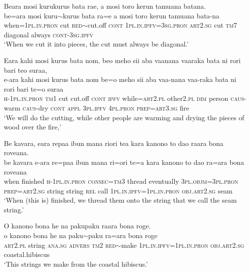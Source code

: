 \ea\label{ex:text20-34}
Beara mosi kurukurus bata rae, a mosi toro kerun tamuana batana.\\
\gll be=ara	mosi	kuru{$\sim$}kurus	bata	ra=e	a	mosi	toro	kerun	tamuana	bata-na\\
     when=1\textsc{pl}.\textsc{in}.\textsc{pron}	cut	\textsc{red}{$\sim$}cut.off	\textsc{cont}	1\textsc{pl}.\textsc{in}.\textsc{ipfv}=3\textsc{sg}.\textsc{pron}	\textsc{art}2.\textsc{sg}	cut	\textsc{tm}7	diagonal	always	\textsc{cont}-3\textsc{sg}.\textsc{ipfv}\\
\glt `When we cut it into pieces, the cut must always be diagonal.'
\z

\ea\label{ex:text20-35}
Eara kahi mosi kurus bata nom, beo meho sii aba vaanana vaaraka bata ni rori bari teo suraa,\\
\gll e-ara	kahi	mosi	kurus	bata	nom	be=o	meho	sii	aba	vaa-nana	vaa-raka	bata	ni	rori	bari	te=o	suraa\\
     \textsc{h}-1\textsc{pl}.\textsc{in}.\textsc{pron}	\textsc{tm}1	cut	cut.off	\textsc{cont}	\textsc{ipfv}	while=\textsc{art}2.\textsc{pl}	other2.\textsc{pl}	\textsc{dim}	person	\textsc{caus}-warm	\textsc{caus}-dry	\textsc{cont}	\textsc{appl}	3\textsc{pl}.\textsc{ipfv}	4\textsc{pl}.\textsc{pron}	\textsc{prep}=\textsc{art}3.\textsc{sg}	fire\\
\glt `We will do the cutting, while other people are warming and drying the pieces of wood over the fire,'
\z

\ea\label{ex:text20-36}
Be kavara, eara repaa ibun mana riori tea kara kanono to dao raara bona roveana.\\
\gll be	kavara	e-ara	re=paa	ibun	mana	ri=ori	te=a	kara	kanono	to	dao	ra=ara	bona	roveana\\
     when	finished	\textsc{h}-1\textsc{pl}.\textsc{in}.\textsc{pron}	\textsc{consec}=\textsc{tm}3	thread	eventually	3\textsc{pl}.\textsc{objm}=3\textsc{pl}.\textsc{pron}	\textsc{prep}=\textsc{art}2.\textsc{sg}	string	string	\textsc{rel}	call	1\textsc{pl}.\textsc{in}.\textsc{ipfv}=1\textsc{pl}.\textsc{in}.\textsc{pron}	\textsc{obj}.\textsc{art}2.\textsc{sg}	seam\\
\glt `When (this is) finished, we thread them onto the string that we call the seam string.'
\z

\newpage
\ea\label{ex:text20-37}
O kanono bona he na pakupaku raara bona roge.\\
\gll o	kanono	bona	he	na	paku{$\sim$}paku	ra=ara	bona	roge\\
     \textsc{art}2.\textsc{pl}	string	\textsc{ana}.\textsc{sg}	\textsc{advers}	\textsc{tm}2	\textsc{red}{$\sim$}make	1\textsc{pl}.\textsc{in}.\textsc{ipfv}=1\textsc{pl}.\textsc{in}.\textsc{pron}	\textsc{obj}.\textsc{art}2.\textsc{sg}	coastal.hibiscus\\
\glt `This strings we make from the coastal hibiscus.'
\z
